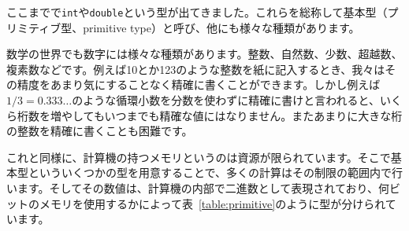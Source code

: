 ここまでで\texttt{int}や\texttt{double}という型が出てきました。これらを総称して基本型（プリミティブ型、primitive type）と呼び、他にも様々な種類があります。

数学の世界でも数字には様々な種類があります。整数、自然数、少数、超越数、複素数などです。例えば10とか123のような整数を紙に記入するとき、我々はその精度をあまり気にすることなく精確に書くことができます。しかし例えば$1/3=0.333\ldots$のような循環小数を分数を使わずに精確に書けと言われると、いくら桁数を増やしてもいつまでも精確な値にはなりません。またあまりに大きな桁の整数を精確に書くことも困難です。

これと同様に、計算機の持つメモリというのは資源が限られています。そこで基本型といういくつかの型を用意することで、多くの計算はその制限の範囲内で行います。そしてその数値は、計算機の内部で二進数として表現されており、何ビットのメモリを使用するかによって表~\ref{table:primitive}のように型が分けられています。

